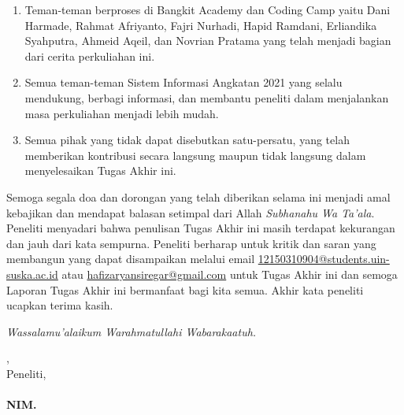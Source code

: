 \begin{enumerate}
	\item Teman-teman berproses di Bangkit Academy dan Coding Camp yaitu Dani Harmade, Rahmat Afriyanto, Fajri Nurhadi, Hapid Ramdani, Erliandika Syahputra, Ahmeid Aqeil, dan Novrian Pratama yang telah menjadi bagian dari cerita perkuliahan ini.
	\item Semua teman-teman Sistem Informasi Angkatan 2021 yang selalu mendukung, berbagi informasi, dan membantu peneliti dalam menjalankan masa perkuliahan menjadi lebih mudah.
	\item Semua pihak yang tidak dapat disebutkan satu-persatu, yang telah memberikan kontribusi secara langsung maupun tidak langsung dalam menyelesaikan Tugas Akhir ini.
\end{enumerate}

Semoga segala doa dan dorongan yang telah diberikan selama ini menjadi amal kebajikan dan mendapat balasan setimpal dari Allah \textit{Subhanahu Wa Ta’ala}. Peneliti menyadari bahwa penulisan Tugas Akhir ini masih terdapat kekurangan dan jauh dari kata sempurna. Peneliti berharap untuk kritik dan saran yang membangun yang dapat disampaikan melalui email \href{mailto:12150310904@students.uin-suska.ac.id}{12150310904@students.uin-suska.ac.id} atau \href{mailto:hafizaryansiregar@gmail.com}{hafizaryansiregar@gmail.com} untuk Tugas Akhir ini dan semoga Laporan Tugas Akhir ini bermanfaat bagi kita semua. Akhir kata peneliti ucapkan terima kasih.

\textit{Wassalamu’alaikum Warahmatullahi Wabarakaatuh.}

\vspace*{0.1cm}



\begin{flushright}
	\kota, \tanggalPersetujuan\\
	Peneliti,\\
	\vspace{2cm}
	\textbf{\underline{\penulis}\\
		\vspace{-0.15cm}
		NIM. \nim}

\end{flushright}

